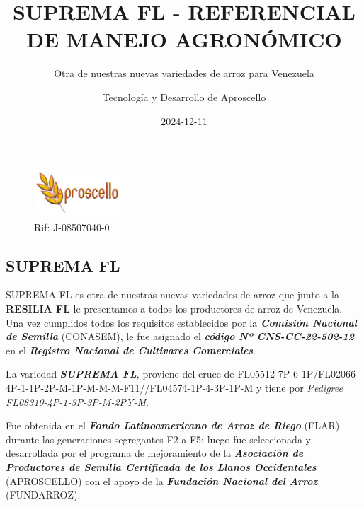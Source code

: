\documentclass[
  letterpaper,
  DIV=11,
  numbers=noendperiod]{scrartcl}
\title{SUPREMA FL - REFERENCIAL DE MANEJO AGRONÓMICO}
\subtitle{Otra de nuestras nuevas variedades de arroz para Venezuela}
\author{Tecnología y Desarrollo de Aproscello}
\date{2024-12-11}
\renewcommand*\contentsname{Table of contents}
\newcommand\contentsname{Table of contents}
\begin{document}
\maketitle

\renewcommand*\contentsname{Table of contents}
{
\hypersetup{linkcolor=}
\setcounter{tocdepth}{3}
\tableofcontents
}
\begin{figure}[H]

{\centering \includegraphics[width=1.27083in,height=0.72917in]{logo.png}

}

\caption{Rif: J-08507040-0}

\end{figure}%

\subsection{SUPREMA FL}\label{suprema-fl}

SUPREMA FL es otra de nuestras nuevas variedades de arroz que junto a la
\textbf{RESILIA FL} le presentamos a todos los productores de arroz de
Venezuela. Una vez cumplidos todos los requisitos establecidos por la
\textbf{\emph{Comisión Nacional de Semilla}} (CONASEM), le fue asignado
el \textbf{\emph{código Nº CNS-CC-22-502-12}} en el
\textbf{\emph{Registro Nacional de Cultivares Comerciales}}.

La variedad \textbf{\emph{SUPREMA FL}}, proviene del cruce de
FL05512-7P-6-1P/FL02066-4P-1-1P-2P-M-1P-M-M-M-F11//FL04574-1P-4-3P-1P-M
y tiene por \emph{Pedigree FL08310-4P-1-3P-3P-M-2PY-M}.

Fue obtenida en el \textbf{\emph{Fondo Latinoamericano de Arroz de
Riego}} (FLAR) durante las generaciones segregantes F2 a F5; luego fue
seleccionada y desarrollada por el programa de mejoramiento de la
\textbf{\emph{Asociación de Productores de Semilla Certificada de los
Llanos Occidentales}} (APROSCELLO) con el apoyo de la
\textbf{\emph{Fundación Nacional del Arroz}} (FUNDARROZ).
\end{document}
